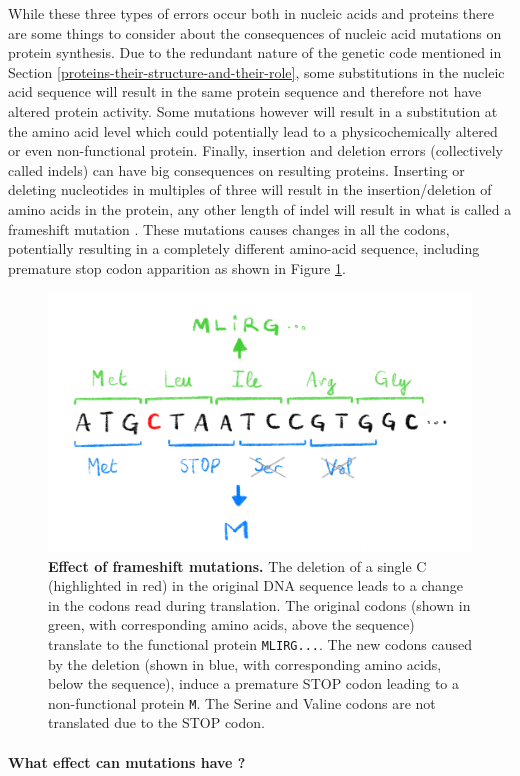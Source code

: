 \documentclass[
  11pt,
  twoside,
  BCOR=10mm,
  listof=totoc]{scrbook}
\newcommand{\extcaption}[2]{
    \caption[#1]{
        \textbf{#1}\newline
        #2
    }
}
\begin{document}
While these three types of errors occur both in nucleic acids and proteins there are some things to consider about the consequences of nucleic acid mutations on protein synthesis. Due to the redundant nature of the genetic code mentioned in Section \ref{proteins-their-structure-and-their-role}, some substitutions in the nucleic acid sequence will result in the same protein sequence and therefore not have altered protein activity. Some mutations however will result in a substitution at the amino acid level which could potentially lead to a physicochemically altered or even non-functional protein. Finally, insertion and deletion errors (collectively called indels) can have big consequences on resulting proteins. Inserting or deleting nucleotides in multiples of three will result in the insertion/deletion of amino acids in the protein, any other length of indel will result in what is called a frameshift mutation \autocite{rothFrameshiftMutations1974}. These mutations causes changes in all the codons, potentially resulting in a completely different amino-acid sequence, including premature stop codon apparition as shown in Figure \ref{fig:frameshift}.

\begin{figure}[h]
\centering
\includegraphics[width=0.5\linewidth]{./figures/Sequence-Intro/Frameshift.png}
\extcaption{Effect of frameshift mutations.}{The deletion of a single C (highlighted in red) in the original DNA sequence leads to a change in the codons read during translation. The original codons (shown in green, with corresponding amino acids, above the sequence) translate to the functional protein \texttt{MLIRG...}. The new codons caused by the deletion (shown in blue, with corresponding amino acids, below the sequence), induce a premature STOP codon leading to a non-functional protein \texttt{M}. The Serine and Valine codons are not translated due to the STOP codon.}
\label{fig:frameshift}
\end{figure}

\hypertarget{what-effect-can-mutations-have}{%
\paragraph{What effect can mutations have ?}\label{what-effect-can-mutations-have}}
\end{document}
